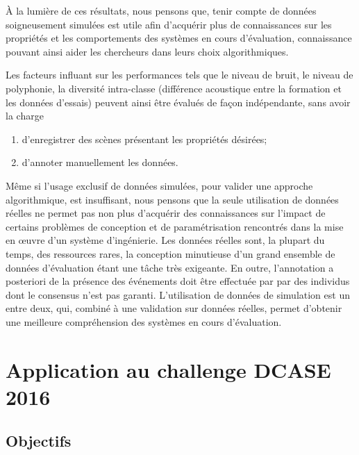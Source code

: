 À la lumière de ces résultats, nous pensons que, tenir compte de données soigneusement simulées est utile afin d'acquérir plus de connaissances sur les propriétés et les comportements des systèmes en cours d'évaluation, connaissance pouvant ainsi aider les chercheurs dans leurs choix algorithmiques. 

Les facteurs influant sur les performances tels que le niveau de bruit, le niveau de polyphonie, la diversité intra-classe (différence acoustique entre la formation et les données d'essais) peuvent ainsi être évalués de façon indépendante, sans avoir la charge 

\begin{enumerate}
\item d'enregistrer des scènes présentant les propriétés désirées;
\item d'annoter manuellement les données.
\end{enumerate}

Même si l'usage exclusif de données simulées, pour valider une approche algorithmique, est insuffisant, nous pensons que la seule utilisation de données réelles ne permet pas non plus d'acquérir des connaissances sur l'impact de certains problèmes de conception et de paramétrisation rencontrés dans la mise en œuvre d'un système d'ingénierie. Les données réelles sont, la plupart du temps, des ressources rares, la conception minutieuse d'un grand ensemble de données d'évaluation étant une tâche très exigeante. En outre, l'annotation a posteriori de la présence des événements doit être effectuée par par des individus dont le consensus n'est pas garanti. L'utilisation de données de simulation est un entre deux, qui, combiné à une validation sur données réelles, permet d'obtenir une meilleure compréhension des systèmes en cours d'évaluation. 


\section{Application au challenge DCASE  2016}

\subsection{Objectifs}


